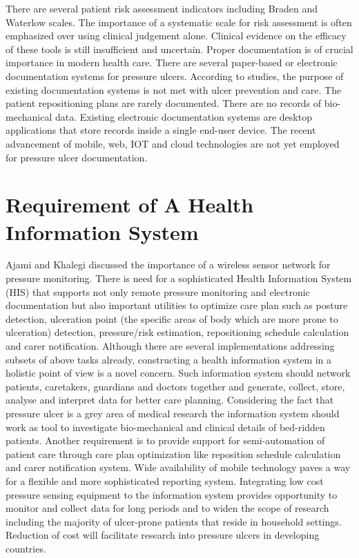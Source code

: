 There are several patient risk assessment indicators including Braden  and Waterlow scales. \cite{bradenscale} The importance of a systematic scale for risk assessment is often emphasized over using clinical judgement alone. Clinical evidence on the efficacy of these tools is still insufficient and uncertain.\cite{cochranerisk}
Proper documentation is of crucial importance in modern health care. There are several paper-based or electronic documentation systems for pressure ulcers. According to studies, the purpose of existing documentation systems is not met with ulcer prevention and care.\cite{sostoolkit} The patient repositioning plans are rarely documented. There are no records of bio-mechanical data. Existing electronic documentation systems are desktop applications that store records inside a single end-user device. The recent advancement of mobile, web, IOT and cloud technologies are not yet employed for pressure ulcer documentation. 

\section{Requirement of A Health Information System}
Ajami and Khalegi discussed the importance of a wireless sensor network for pressure monitoring.\cite{his} There is need for a sophisticated Health Information System (HIS) that supports not only remote pressure monitoring and electronic documentation but also important utilities to optimize care plan such as posture detection, ulceration point (the specific areas of body which are more prone to ulceration) detection, pressure/risk estimation, repositioning schedule calculation and carer notification. Although there are several implementations addressing subsets of above tasks already, constructing a health information system in a holistic point of view is a novel concern. Such information system should network patients, caretakers, guardians and doctors together and generate, collect, store, analyse and interpret data for better care planning. Considering the fact that pressure ulcer is a grey area of medical research the information system should work as tool to investigate bio-mechanical and clinical details of bed-ridden patients. Another requirement is to provide support for semi-automation of patient care through care plan optimization like reposition schedule calculation and carer notification system. Wide availability of mobile technology paves a way for a flexible and more sophisticated reporting system. Integrating low cost pressure sensing equipment to the information system provides opportunity to monitor and collect data for long periods and to widen the scope of research including the majority of ulcer-prone patients that reside in household settings. Reduction of cost will facilitate research into pressure ulcers in developing countries.

